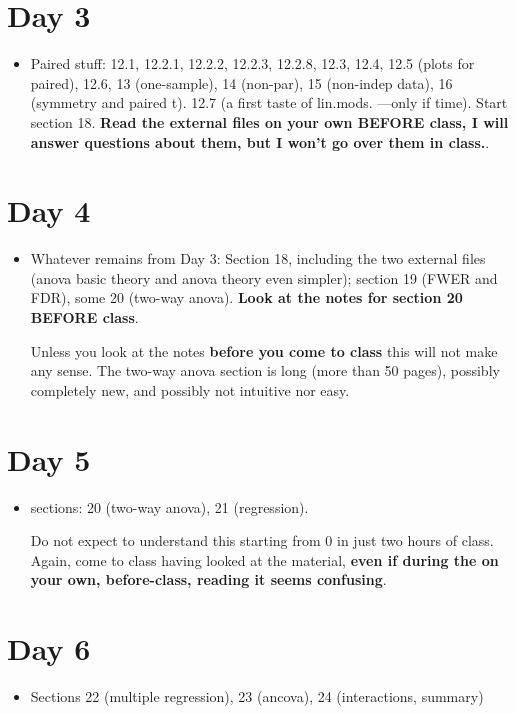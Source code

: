 \documentclass[12pt]{article}
\begin{document}
\section*{Day 3}
\label{sec:org609aabb}
\begin{itemize}
\item Paired stuff: 12.1, 12.2.1, 12.2.2, 12.2.3, 12.2.8, 12.3, 12.4, 12.5 (plots for paired), 12.6, 13 (one-sample), 14 (non-par), 15 (non-indep data), 16 (symmetry and paired t). 12.7 (a first taste of lin.mods. ---only if time). Start section 18. \textbf{Read the external files on your own BEFORE class, I will answer questions about them, but I won't go over them in class.}.
\end{itemize}
\section*{Day 4 }
\label{sec:org394fbf9}
\begin{itemize}
\item Whatever remains from Day 3: Section 18, including the two external files (anova basic theory and anova theory even simpler); section 19 (FWER and FDR), some 20 (two-way anova). \textbf{Look at the notes for section 20 BEFORE class}.

   Unless you look at the notes \textbf{before you come to class} this will not make any sense. The two-way anova section is long (more than 50 pages), possibly completely new, and possibly not intuitive nor easy.

\end{itemize}
\section*{Day 5 }
\label{sec:orgcb0a12f}
\begin{itemize}
\item sections: 20 (two-way anova), 21 (regression).


  Do not expect to understand this starting from 0 in just two hours of class. Again, come to class having looked at the material, \textbf{even if during the on your own, before-class, reading it seems confusing}.
\end{itemize}
\section*{Day 6 }
\label{sec:org6f322e8}
\begin{itemize}
\item Sections 22 (multiple regression), 23 (ancova), 24 (interactions, summary)
\end{itemize}
\end{document}
